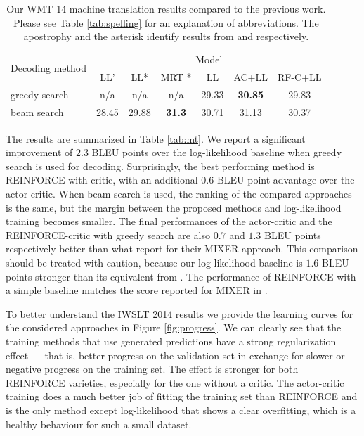\documentclass{article} %
\begin{document}
\begin{table}%
    \centering
    \caption{
        Our WMT 14 machine translation results compared to the previous work.
        Please see Table \ref{tab:spelling} for an explanation of
        abbreviations. The apostrophy and the asterisk identify results from
        \citep{bahdanau2015neural} and \citep{shen2015minimum} respectively.
    }
    \begin{tabular}{l | c | c | c | c | c | c}
        \multirow{2}{*}{Decoding method} & \multicolumn{6}{|c}{Model} \\
                                         & LL' & LL* & MRT * & LL & AC+LL & RF-C+LL \\
        \hline\hline
        greedy search & n/a & n/a & n/a & 29.33 & \textbf{30.85} & 29.83\\
        beam search   & 28.45 & 29.88 & \textbf{31.3} & 30.71 & 31.13 & 30.37
    \end{tabular}
    \label{tab:wmt}
\end{table}


The results are summarized in Table \ref{tab:mt}. We report
a significant improvement of $2.3$ BLEU points over the log-likelihood baseline
when greedy search is used for decoding. Surprisingly, the best performing method
is REINFORCE with critic, with an additional $0.6$ BLEU point advantage
over the actor-critic. When beam-search is used, the ranking of the compared approaches
is the same, but the margin between the proposed methods and log-likelihood training
becomes smaller.  The final performances of the actor-critic and the
REINFORCE-critic with greedy search are also $0.7$ and $1.3$ BLEU points
respectively better than what \citet{ranzato2015sequence} report for their
MIXER approach.  This comparison should be treated with caution,
because our log-likelihood baseline is $1.6$ BLEU points stronger
than its equivalent from \citep{ranzato2015sequence}. The performance
of REINFORCE with a simple baseline matches the score reported for MIXER in
\citet{ranzato2015sequence}.

To better understand the IWSLT 2014 results we provide
the learning curves for the considered approaches in Figure
\ref{fig:progress}. We can clearly see that the training methods that use
generated predictions have a strong regularization effect --- that is, better
progress on the validation set in exchange for slower or negative progress on
the training set. The effect is stronger for both REINFORCE varieties, 
especially for the one without a critic. The actor-critic training does a 
much better job of fitting the training set than REINFORCE and is the only
method except log-likelihood that shows a clear overfitting, which is a healthy 
behaviour for such a small dataset.
\end{document}
